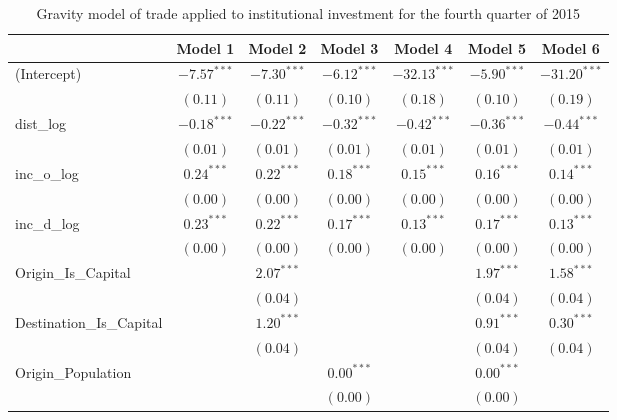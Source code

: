 \begin{table}
	\begin{center}
		\small
		\caption[Gravity Model of Trade for Q4 2015]{Gravity model of trade applied to institutional investment for the fourth quarter of 2015}
		\begin{tabular}{l c c c c c c }
			\hline
			& Model 1 & Model 2 & Model 3 & Model 4 & Model 5 & Model 6 \\
			\hline
			(Intercept)                  & $-7.57^{***}$ & $-7.30^{***}$ & $-6.12^{***}$ & $-32.13^{***}$ & $-5.90^{***}$ & $-31.20^{***}$ \\
			& $(0.11)$      & $(0.11)$      & $(0.10)$      & $(0.18)$       & $(0.10)$      & $(0.19)$       \\
			dist\_log                    & $-0.18^{***}$ & $-0.22^{***}$ & $-0.32^{***}$ & $-0.42^{***}$  & $-0.36^{***}$ & $-0.44^{***}$  \\
			& $(0.01)$      & $(0.01)$      & $(0.01)$      & $(0.01)$       & $(0.01)$      & $(0.01)$       \\
			inc\_o\_log                  & $0.24^{***}$  & $0.22^{***}$  & $0.18^{***}$  & $0.15^{***}$   & $0.16^{***}$  & $0.14^{***}$   \\
			& $(0.00)$      & $(0.00)$      & $(0.00)$      & $(0.00)$       & $(0.00)$      & $(0.00)$       \\
			inc\_d\_log                  & $0.23^{***}$  & $0.22^{***}$  & $0.17^{***}$  & $0.13^{***}$   & $0.17^{***}$  & $0.13^{***}$   \\
			& $(0.00)$      & $(0.00)$      & $(0.00)$      & $(0.00)$       & $(0.00)$      & $(0.00)$       \\
			Origin\_Is\_Capital          &               & $2.07^{***}$  &               &                & $1.97^{***}$  & $1.58^{***}$   \\
			&               & $(0.04)$      &               &                & $(0.04)$      & $(0.04)$       \\
			Destination\_Is\_Capital     &               & $1.20^{***}$  &               &                & $0.91^{***}$  & $0.30^{***}$   \\
			&               & $(0.04)$      &               &                & $(0.04)$      & $(0.04)$       \\
			Origin\_Population           &               &               & $0.00^{***}$  &                & $0.00^{***}$  &                \\
			&               &               & $(0.00)$      &                & $(0.00)$      &                \\

\end{tabular}
\end{center}
\end{table}
